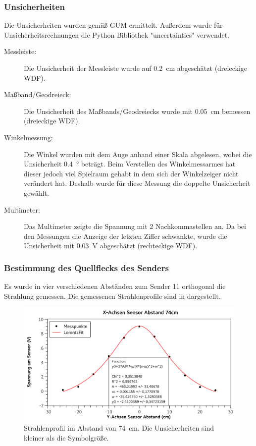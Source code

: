 \documentclass[
	a4paper,
	12pt,
	pagesize,
	ngerman
]{scrartcl}
\begin{document}
	\subsubsection{Unsicherheiten} %
	Die Unsicherheiten wurden gemäß GUM ermittelt. 
	Außerdem wurde für Unsicherheitsrechnungen die Python Bibliothek "uncertainties" verwendet.
	\begin{description}
		\item[Messleiste:] Die Unsicherheit der Messleiste wurde auf \SI{0,2}{cm} abgeschätzt (dreieckige WDF).
		\item[Maßband/Geodreieck:] Die Unsicherheit des Maßbands/Geodreiecks wurde mit \SI{0,05}{cm} bemessen (dreieckige WDF).
		\item[Winkelmessung:]  Die Winkel wurden mit dem Auge anhand einer Skala abgelesen, wobei die Unsicherheit \SI{0,4}{\degree} beträgt. Beim Verstellen des Winkelmessarmes hat dieser jedoch viel Spielraum gehabt in dem sich der Winkelzeiger nicht verändert hat. Deshalb wurde für diese Messung die doppelte Unsicherheit gewählt.
		\item[Multimeter:] Das Multimeter zeigte die Spannung mit 2 Nachkommastellen an. Da bei den Messungen die Anzeige der letzten Ziffer schwankte, wurde die Unsicherheit mit \SI{0,03}{V} abgeschätzt (rechteckige WDF).
	\end{description}

	\subsubsection{Bestimmung des Quellflecks des Senders}
	Es wurde in vier verschiedenen Abständen zum Sender 11 orthogonal die Strahlung gemessen. %
	Die gemessenen Strahlenprofile sind in  dargestellt. 
	\begin{figure}[H] %
		\includegraphics[width=1\textwidth]{fig_74cm}
		\centering
		\caption{Strahlenprofil im Abstand von \SI{74}{cm}. Die Unsicherheiten sind kleiner als die Symbolgröße.}
		\label{fig_74cm}
		\centering
	\end{figure}
\end{document}
